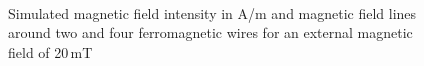\begin{figure}[H]
            \begin{subfigure}{0.49\textwidth}
                  \flushleft
          \end{subfigure}\hfill
        \begin{subfigure}{0.49\textwidth}
                \flushright
        \end{subfigure}
        \\
        
        \caption[Simulated magnetic field intensity around two and four wires]{Simulated magnetic field intensity in A/m and magnetic field lines around two and four ferromagnetic wires for an external magnetic field of 20\,mT}
        \label{fig:esem_prax}
  \end{figure}
  
